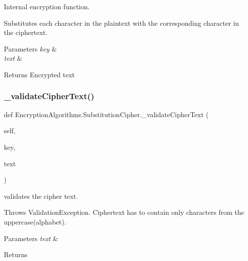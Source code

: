 Internal encryption function. 

Substitutes each character in the plaintext with the corresponding character in the ciphertext.


\begin{DoxyParams}{Parameters}
{\em key} & \\
\hline
{\em text} & \\
\hline
\end{DoxyParams}
\begin{DoxyReturn}{Returns}
Encrypted text 
\end{DoxyReturn}
\mbox{\label{classEncryptionAlgorithms_1_1SubstitutionCipher_af8725d1344b2f6dd47f1e3303ab049eb}} 
\subsubsection{\texorpdfstring{\+\_\+validate\+Cipher\+Text()}{\_validateCipherText()}}
{\footnotesize\ttfamily def Encryption\+Algorithms.\+Substitution\+Cipher.\+\_\+validate\+Cipher\+Text (\begin{DoxyParamCaption}\item[{}]{self,  }\item[{}]{key,  }\item[{}]{text }\end{DoxyParamCaption})\hspace{0.3cm}{\ttfamily [private]}}



validates the cipher text. 

Throws Validation\+Exception. Ciphertext has to contain only characters from the uppercase(alphabet).


\begin{DoxyParams}{Parameters}
{\em text} & \\
\hline
\end{DoxyParams}
\begin{DoxyReturn}{Returns}

\end{DoxyReturn}
\mbox{\label{classEncryptionAlgorithms_1_1SubstitutionCipher_a3ec601adf1b00d35706c42afac3d194e}} 
